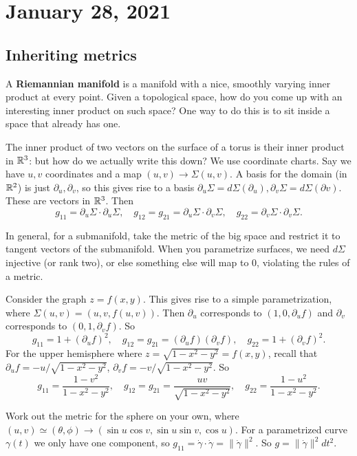 \section{January 28, 2021}
\subsection{Inheriting metrics}
A \textbf{Riemannian manifold} is a manifold with a nice, smoothly varying inner product at every point. Given a topological space, how do you come up with an interesting inner product on such space? One way to do this is to sit inside a space that already has one. 
\begin{example}
The inner product of two vectors on the surface of a torus is their inner product in $\mathbb{R}^3$: but how do we actually write this down? We use coordinate charts. Say we have $u,v$ coordinates and a map $(u,v) \to \Sigma(u,v)$. A basis for the domain (in $\mathbb{R}^2$) is just $\partial _u,\partial _v$, so this gives rise to a basis $\partial _u \Sigma=d\Sigma(\partial _u), \partial _v \Sigma=d\Sigma(\partial v)$. These are vectors in $\mathbb{R}^3$. Then 
\[
g_{11}=\partial _u\Sigma \cdot \partial _u\Sigma,\quad g_{12}=g_{21}=\partial _u\Sigma \cdot \partial _v\Sigma,\quad g_{22}=\partial _v\Sigma\cdot \partial _v\Sigma.
\] 
\end{example}
        In general, for a submanifold, take the metric of the big space and restrict it to tangent vectors of the submanifold. When you parametrize surfaces, we need $d\Sigma$ injective (or rank two), or else something else will map to 0, violating the rules of a metric.
        \begin{example}
            Consider the graph $z=f(x,y)$. This gives rise to a simple parametrization, where $\Sigma(u,v)=(u,v,f(u,v))$. Then $\partial _u$ corresponds to $(1,0,\partial _uf)$ and $\partial _v$ corresponds to $(0,1,\partial _vf)$. So \[
                g_{11}=1+(\partial _uf)^2,\quad g_{12}=g_{21}=(\partial _uf)(\partial _vf),\quad g_{22}=1+(\partial _vf)^2.
            \] For the upper hemisphere where $z=\sqrt{1-x^2-y^2} =f(x,y)$, recall that $\partial _u f=-u /\sqrt{1-x^2-y^2} $, $\partial _vf=-v /\sqrt{1-x^2-y^2} $. So \[
            g_{11}=\frac{1-v^2}{1-x^2-y^2},\quad g_{12}=g_{21}=\frac{uv}{\sqrt{1-x^2-y^2} },\quad g_{22}=\frac{1-u^2}{1-x^2-y^2}.
            \] 
        \end{example}
        Work out the metric for the sphere on your own, where $(u,v)\simeq (\theta,\phi) \to (\sin u \cos v, \sin u \sin v, \cos u)$. For a parametrized curve $\gamma (t)$ we only have one component, so $g_{11}=\dot \gamma \cdot\dot \gamma  =\|\dot\gamma \|^2$. So $g=\|\dot\gamma \|^2 dt^2$.

